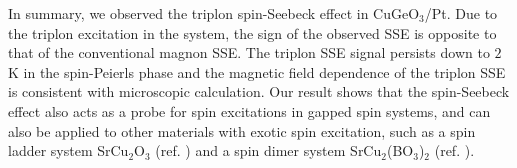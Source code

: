 \documentclass{nature}
\begin{document}
\par 

In summary, we observed the triplon spin-Seebeck effect in CuGeO$_3$/Pt.
Due to the triplon excitation in the system, 
the sign of the observed SSE is opposite to that of the conventional magnon SSE. 
The triplon SSE signal persists down to $2$ K in the spin-Peierls phase and
  the magnetic field dependence of the triplon SSE is consistent with microscopic calculation.
Our result shows that the spin-Seebeck effect also acts as a probe for spin excitations in gapped spin systems, and can also be applied to other materials with exotic spin excitation, such as a spin ladder system SrCu$_2$O$_3$ (ref. \cite{Azuma:1994hf}) and a spin dimer system SrCu$_2$(BO$_3$)$_2$ (ref. \cite{Kageyama:1999ke}).





\par 
\end{document}
